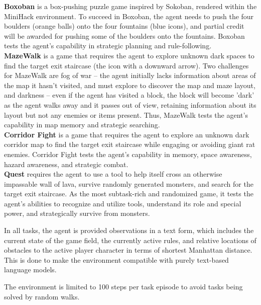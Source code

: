\textbf{Boxoban} is a box-pushing puzzle game inspired by Sokoban, rendered within the MiniHack environment. To succeed in Boxoban, the agent needs to push the four boulders (orange balls) onto the four fountains (blue icons), and partial credit will be awarded for pushing some of the boulders onto the fountains. Boxoban tests the agent's capability in strategic planning and rule-following.
\newline
\\
\textbf{MazeWalk} is a game that requires the agent to explore unknown dark spaces to find the target exit staircase (the icon with a downward arrow). Two challenges for MazeWalk are fog of war -- the agent initially lacks information about areas of the map it hasn't visited, and must explore to discover the map and maze layout, and darkness -- even if the agent has visited a block, the block will become 'dark' as the agent walks away and it passes out of view, retaining information about its layout but not any enemies or items present. Thus, MazeWalk tests the agent's capability in map memory and strategic searching.
\newline
\\
\textbf{Corridor Fight} is a game that requires the agent to explore an unknown dark corridor map to find the target exit staircase while engaging or avoiding giant rat enemies. Corridor Fight tests the agent's capability in memory, space awareness, hazard awareness, and strategic combat.
\newline
\\
\textbf{Quest} requires the agent to use a tool to help itself cross an otherwise impassable wall of lava, survive randomly generated monsters, and search for the target exit staircase. As the most subtask-rich and randomized game, it tests the agent's abilities to recognize and utilize tools, understand its role and special power, and strategically survive from monsters.

In all tasks, the agent is provided observations in a text form, which includes the current state of the game field, the currently active rules, and relative locations of obstacles to the active player character in terms of shortest Manhattan distance. This is done to make the environment compatible with purely text-based language models.

The environment is limited to 100 steps per task episode to avoid tasks being solved by random walks.